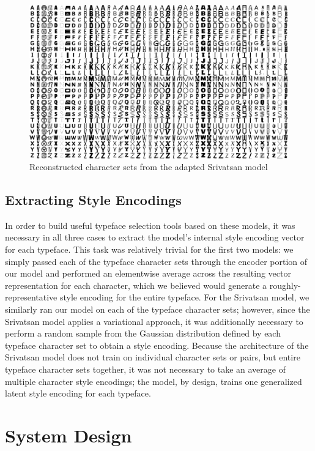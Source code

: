 \begin{figure}[h]
    \centering
    \includegraphics[width=\textwidth]{images/srivatsan-reconstructions.png}
    \caption{Reconstructed character sets from the adapted Srivatsan model}
    \label{fig:srivatsan-reconstructions}
\end{figure}

\subsection{Extracting Style Encodings}

In order to build useful typeface selection tools based on these models, it was necessary in all three cases to extract the model's internal style encoding vector for each typeface. This task was relatively trivial for the first two models: we simply passed each of the typeface character sets through the encoder portion of our model and performed an elementwise average across the resulting vector representation for each character, which we believed would generate a roughly-representative style encoding for the entire typeface. For the Srivatsan model, we similarly ran our model on each of the typeface character sets; however, since the Srivatsan model applies a variational approach, it was additionally necessary to perform a random sample from the Gaussian distribution defined by each typeface character set to obtain a style encoding. Because the architecture of the Srivatsan model does not train on individual character sets or pairs, but entire typeface character sets together, it was not necessary to take an average of multiple character style encodings; the model, by design, trains one generalized latent style encoding for each typeface.

\section{System Design}

